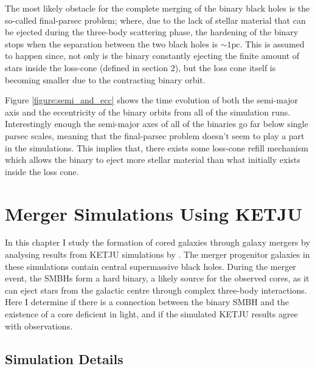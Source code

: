 \documentclass[english, oneside]{HYgradu}
\begin{document}

The most likely obstacle for the complete merging of the binary black holes is the so-called final-parsec problem; where, due to the lack of stellar material that can be ejected during the three-body scattering phase, the hardening of the binary stops when the separation between the two black holes is $\sim 1 \mathrm{pc}$. This is assumed to happen since, not only is the binary constantly ejecting the finite amount of stars inside the loss-cone (defined in section 2), but the loss cone itself is becoming smaller due to the contracting binary orbit.

Figure \ref{figure:semi_and_ecc} shows the time evolution of both the semi-major axis and the eccentricity of the binary orbits from all of the simulation runs. Interestingly enough the semi-major axes of all of the binaries go far below single parsec scales, meaning that the final-parsec problem doesn't seem to play a part in the simulations. This implies that, there exists some loss-cone refill mechanism which allows the binary to eject more stellar material than what initially exists inside the loss cone.



\chapter{Merger Simulations Using KETJU}

In this chapter I study the formation of cored galaxies through galaxy mergers by analysing results from KETJU simulations by \cite{Rantala2018}. The merger progenitor galaxies in these simulations contain central supermassive black holes. During the merger event, the SMBHs form a hard binary, a likely source for the observed cores, as it can eject stars from the galactic centre through complex three-body interactions. Here I determine if there is a connection between the binary SMBH and the existence of a core deficient in light, and if the simulated KETJU results agree with observations.


\section{Simulation Details}
\end{document}
